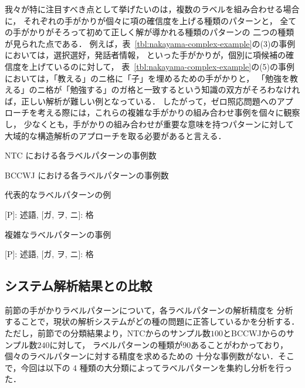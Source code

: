 \documentclass[japanese]{jnlp_1.4}
\begin{document}
我々が特に注目すべき点として挙げたいのは，複数のラベルを組み合わせる場合に，
それぞれの手がかりが個々に項の確信度を上げる種類のパターンと，
全ての手がかりがそろって初めて正しく解が導かれる種類のパターンの
二つの種類が見られた点である．
例えば，表~\ref{tbl:nakayama-complex-example}の(3)の事例においては，選択選好，発話者情報，
といった手がかりが，個別に項候補の確信度を上げているのに対して，
表~\ref{tbl:nakayama-complex-example}の(5)の事例においては，「教える」のニ格に「子」を埋めるための手がかりと，
「勉強を教える」のニ格が「勉強する」のガ格と一致するという知識の双方がそろわなければ，正しい解析が難しい例となっている．
したがって，ゼロ照応問題へのアプローチを考える際には，これらの複雑な手がかりの組み合わせ事例を個々に観察し，
少なくとも，手がかりの組み合わせが重要な意味を持つパターンに対して大域的な構造解析のアプローチを取る必要があると言える．

\begin{table}[p]
\caption{NTC における各ラベルパターンの事例数}
\label{tbl:nakayama-ntc-label-pattern-freq}

\end{table}

\begin{table}[p]
\caption{BCCWJ における各ラベルパターンの事例数}
\label{tbl:nakayama-bccwj-label-pattern-freq}

\end{table}

\begin{table}[t]
\caption{代表的なラベルパターンの例}
\label{tbl:clue-example}

\par\vspace{4pt}\small [P]: 述語, [ガ, ヲ, ニ]: 格
\end{table}

\begin{table}[p]
\addtolength{\normalbaselineskip}{-2pt}
\caption{複雑なラベルパターンの事例}
\label{tbl:nakayama-complex-example}

\par\vspace{4pt}\small [P]: 述語, [ガ, ヲ, ニ]: 格
\end{table}


\subsection{システム解析結果との比較}

前節の手がかりラベルパターンについて，各ラベルパターンの解析精度を
分析することで，現状の解析システムがどの種の問題に正答しているかを分析する．
ただし，前節での分類結果より，NTCからのサンプル数$100$とBCCWJからのサンプル数$240$に対して，
ラベルパターンの種類が$90$あることがわかっており，個々のラベルパターンに対する精度を求めるための
十分な事例数がない．そこで，今回は以下の 4 種類の大分類によってラベルパターンを集約し分析を行った．
\end{document}
